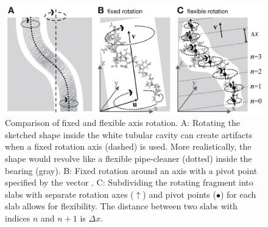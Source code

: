 \begin{figure}
\centerline{\includegraphics[width=13cm]{plots/rotation.pdf}}
\caption[Fixed and flexible axis rotation]{Comparison of fixed and flexible axis
rotation. 
{\sf A:} Rotating the sketched shape inside the white tubular cavity can create
artifacts when a fixed rotation axis (dashed) is used. More realistically, the
shape would revolve like a flexible pipe-cleaner (dotted) inside the bearing (gray). 
{\sf B:} Fixed rotation around an axis  with a pivot point
specified by the vector . 
{\sf C:} Subdividing the rotating fragment into slabs with separate rotation
axes ($\uparrow$) and pivot points ($\bullet$) for each slab allows for
flexibility. The distance between two slabs with indices $n$ and $n+1$ is $\Delta x$.}
\label{fig:rotation}
\end{figure}

